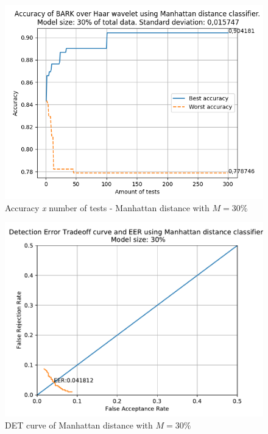  \begin{figure}[H]
\centering
\includegraphics[scale=.6]{images/results/confusionMatrices/classifier_Manhattan_30.png}
\caption{Accuracy \textit{x} number of tests - Manhattan distance with $M=30\%$}
\label{fig:classifiermanhattan30}
\end{figure}
\begin{figure}[H]
\centering
\includegraphics[scale=.6]{images/results/det/DET_for_classifier_Manhattan_30}
\caption{DET curve of Manhattan distance with $M=30\%$}
\label{fig:detforclassifiermanhattan30}
\end{figure}
